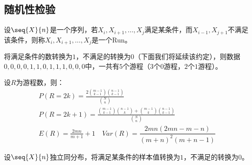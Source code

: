 \subsection{随机性检验}
\begin{definition}
	设$\seq{X}{n}$是一个序列，若$X_{i},X_{i+1},\dots,X_{j}$满足某条件，而$X_{i-1},X_{j+1}$不满足该条件，则称$X_{i},X_{i+1},\dots,X_{j}$是一个\gls{Run}。
\end{definition}
\begin{example}
	将满足条件的数转换为$1$，不满足的转换为$0$（下面我们将延续该约定），则数据$0,0,0,0,1,1,0,1,1,1,0,0,0$中，一共有$5$个游程（$3$个$0$游程，$2$个$1$游程）。
\end{example}
\begin{property}\label{prop:Runs}
	设$R$为游程数，则：
	\begin{gather*}
		P(R=2k)=\frac{2\binom{m-1}{k-1}\binom{n-1}{k-1}}{\binom{N}{n}} \\
		P(R=2k+1)=\frac{\binom{m-1}{k-1}\binom{n-1}{k}+\binom{m-1}{k}\binom{n-1}{k-1}}{\binom{N}{n}} \\
		E(R) = \frac{2mn}{m+1}+1\quad Var(R)=\dfrac{2mn(2mn-m-n)}{(m+n)^2(m+n-1)}
	\end{gather*}
\end{property}
\begin{method}
	设$\seq{X}{n}$独立同分布，将满足某条件的样本值转换为$1$，不满足的转换为$0$。
\end{method}